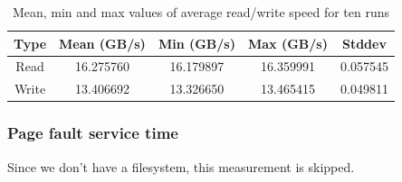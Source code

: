 \begin{table}[H]
\caption{Mean, min and max values of average read/write speed for ten runs}
\begin{tabular}{|c|c|c|c|c|} 
    \hline
    Type & Mean (GB/s) & Min (GB/s)& Max (GB/s)& Stddev\\ 
    \hline
    Read & 16.275760& 16.179897 & 16.359991 & 0.057545\\
    \hline
    Write & 13.406692 & 13.326650 & 13.465415 & 0.049811\\ 
    \hline
   \end{tabular}
    \label{tab:t6}
\end{table}

\subsubsection{Page fault service time}
Since we don't have a filesystem, this measurement is skipped.